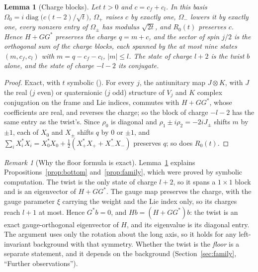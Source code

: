 \documentclass[11pt]{article}
\newtheorem{lemma}[theorem]{Lemma}
\theoremstyle{definition}
\theoremstyle{remark}
\newtheorem{remark}[theorem]{Remark}
\begin{document}
\begin{lemma}[Charge blocks]\label{lem:charge}
Let $t>0$ and $c=c_f+c_l$. In this basis $\Omega_0=i\operatorname{diag}\bigl(c(t-2)/\sqrt t\bigr)$, $\Omega_+$
raises $c$ by exactly one, $\Omega_-$ lowers it by exactly one, every nonzero entry of $\Omega_\pm$ has modulus
$\sqrt{2t}$, and $R_0(t)$ preserves $c$. Hence $H+GG^*$ preserves the charge $q=m+c$, and the sector of spin $j/2$
is the orthogonal sum of the charge blocks, each spanned by the at most nine states $(m,c_f,c_l)$ with
$m=q-c_f-c_l$, $|m|\le l$. The state of charge $l+2$ is the twist $b$ alone, and the state of charge $-l-2$ its
conjugate.
\end{lemma}
\begin{proof}
Exact, with $t$ symbolic (). For every $j$, the antiunitary map $J\otimes K$, with $J$ the real ($j$ even) or quaternionic ($j$ odd)
structure of $V_j$ and $K$ complex conjugation on the frame and Lie indices, commutes with $H+GG^*$, whose
coefficients are real, and reverses the charge; so the block of charge $-l-2$ has the same entry as the twist's.
Since $\rho_0$ is diagonal and
$\rho_1\pm i\rho_2=-2iJ_\pm$ shifts $m$ by $\pm1$, each of $X_0$ and $X_\pm$ shifts $q$ by $0$ or $\pm1$, and
$\sum_iX_i^*X_i=X_0^*X_0+\tfrac12(X_+^*X_++X_-^*X_-)$ preserves $q$; so does $R_0(t)$.
\end{proof}

\begin{remark}[Why the floor formula is exact]\label{rem:counting}
Lemma~\ref{lem:charge} explains Propositions~\ref{prop:bottom} and~\ref{prop:family}, which were proved by
symbolic computation. The twist is the only state of charge $l+2$, so it spans a $1\times1$ block and is an
eigenvector of $H+GG^*$. The gauge map preserves the charge, with the gauge parameter $\xi$ carrying the weight
and the Lie index only, so its charges reach $l+1$ at most. Hence $G^*b=0$, and $Hb=(H+GG^*)b$: the twist is an
exact gauge-orthogonal eigenvector of $H$, and its eigenvalue is its diagonal entry. The argument uses only the
rotation about the long axis, so it holds for any left-invariant background with that symmetry. Whether the twist
is the \emph{floor} is a separate statement, and it depends on the background (Section~\ref{sec:family},
``Further observations'').
\end{remark}
\end{document}
